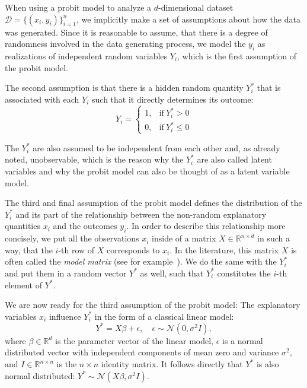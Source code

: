 When using a probit model to analyze a $d$-dimensional dataset
$\mathcal{D} = \{(x_i, y_i)\}_{i=1}^n$, we implicitly
make a set of assumptions about how the data was generated.
Since it is reasonable to assume, that there is a degree of randomness
involved in the data generating process, we model the $y_i$ as realizations
of independent random variables $Y_i$, which is the first
assumption of the probit model.

The second assumption is that there is
a hidden random quantity
$Y_i^\ast$ that is associated with each $Y_i$ such that it
directly determines its outcome:
\begin{equation}
    Y_i =
    \begin{cases}
        1, & \text{if}\ Y_i^\ast > 0    \\
        0, & \text{if}\ Y_i^\ast \leq 0
    \end{cases}
\end{equation}

\noindent The $Y_i^\ast$ are also assumed to be independent from each
other and, as already noted, unobservable,
which is the reason why the $Y_i^\ast$ are also called latent variables and
why the probit model can also be thought of as a latent variable model.

The third and final assumption of the probit model defines the
distribution of the $Y_i^\ast$ and its part of the relationship
between the non-random explanatory quantities $x_i$ and the outcomes $y_i$.
In order to describe this relationship more concisely,
we put all the observations $x_i$ inside of a
matrix $X \in \mathbb{R}^{n \times d}$ in such a way, that
the $i$-th row of $X$ corresponds to $x_i$.
In the literature, this matrix $X$ is often called the \textit{model matrix}
(see for example~\cite{glm-agresti}).
We do the same with the $Y_i^\ast$ and put them in a
random vector $Y^\ast$ as well, such that $Y_i^\ast$ constitutes
the $i$-th element of $Y^\ast$.

We are now ready for the third assumption of the probit model:
The explanatory variables
$x_i$ influence $Y_i^\ast$ in the form of a classical linear model:
\begin{equation}
    Y^\ast = X \beta + \epsilon, \quad \epsilon \sim \mathcal{N}(0, \sigma^2 I),
\end{equation}
where $\beta \in \mathbb{R}^d$ is the parameter vector of the linear model,
$\epsilon$ is a normal distributed vector with independent components of
mean zero and variance $\sigma^2$,
and
$I \in \mathbb{R}^{n \times n}$ is the $n \times n$ identity matrix.
It follows directly that $Y^\ast$ is also normal distributed:
$Y^\ast \sim \mathcal{N}(X \beta, \sigma^2 I)$.

